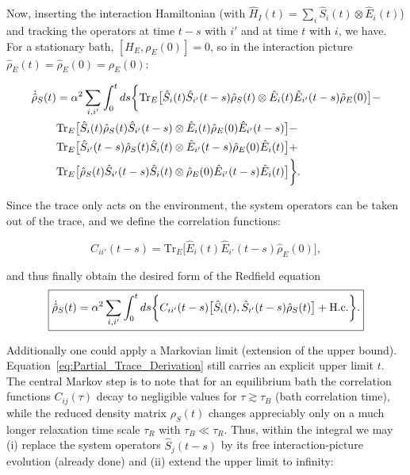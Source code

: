 \noindent
Now, inserting the interaction Hamiltonian (with $\hat{H}_I(t) = \sum_i \hat{S}_i(t) \otimes \hat{E}_i(t)$) and tracking the operators at time $t - s$ with $i'$ and at time $t$ with $i$, we have. For a stationary bath, $[H_E, \rho_E(0)]=0$, so in the interaction picture $\hat{\rho}_E(t)=\hat{\rho}_E(0)=\rho_E(0)$:

\begin{align}
	\dot{\hat{\rho}}_S(t) & = \alpha^2  \sum_{i, i'} \int_0^t ds
	\bigg\{
	\mathrm{Tr}_E \big[ \hat{S}_i(t) \hat{S}_{i'}(t-s) \hat{\rho}_S(t)      \otimes   \hat{E}_{i}(t) \hat{E}_{i'}(t-s) \hat{\rho}_E(0)  \big] -  \notag                         \\
	                      & \mathrm{Tr}_E \big[ \hat{S}_i(t) \hat{\rho}_S(t) \hat{S}_{i'}(t-s)      \otimes   \hat{E}_{i}(t) \hat{\rho}_E(0) \hat{E}_{i'}(t-s)  \big] - \notag  \\
	                      & \mathrm{Tr}_E \big[ \hat{S}_{i'}(t-s) \hat{\rho}_S(t) \hat{S}_i(t)      \otimes   \hat{E}_{i'}(t-s) \hat{\rho}_E(0) \hat{E}_{i}(t)  \big] +  \notag \\
	                      & \mathrm{Tr}_E \big[ \hat{\rho}_S(t) \hat{S}_{i'}(t-s) \hat{S}_i(t)      \otimes   \hat{\rho}_E(0) \hat{E}_{i'}(t-s) \hat{E}_{i}(t)  \big]
	\bigg\}.
	\label{eq:Interaction_Hamiltonian_Expansion}
\end{align}

\noindent
Since the trace only acts on the environment, the system operators can be taken out of the trace, and we define the correlation functions:

\begin{equation}
	C_{ii'}(t - s) = \mathrm{Tr}_E \big[\hat{E}_{i}(t) \hat{E}_{i'}(t-s) \hat{\rho}_E(0)\big],
	\label{eq:Environment_Correlation_Function}
\end{equation}

\noindent
and thus finally obtain the desired form of the Redfield equation
\begin{align}
	\boxed{%
		\dot{\hat{\rho}}_S(t) = \alpha^2  \sum_{i, i'} \int_0^t ds
		\bigg\{
		C_{ii'}(t - s) \big[ \hat{S}_i(t),  \hat{S}_{i'}(t-s) \hat{\rho}_S(t) \big] + \text{H.c.}
		\bigg\}.%
	}
	\label{eq:Redfield_Equation_Final}
\end{align}

\noindent
Additionally one could apply a Markovian limit (extension of the upper bound).
Equation~\eqref{eq:Partial_Trace_Derivation} still carries an explicit upper limit $t$. The central Markov step is to note that for an equilibrium bath the correlation functions $C_{ij}(\tau)$ decay to negligible values for $\tau \gtrsim \tau_B$ (bath correlation time), while the reduced density matrix $\rho_S(t)$ changes appreciably only on a much longer relaxation time scale $\tau_R$ with $\tau_B \ll \tau_R$. Thus, within the integral we may (i) replace the system operators $\hat{S}_j(t-s)$ by its free interaction-picture evolution (already done) and (ii) extend the upper limit to infinity:

